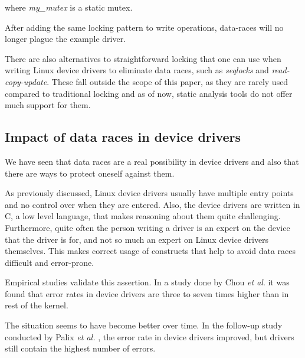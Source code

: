 \documentclass[..thesis.tex]{subfiles}
\begin{document}
where \textit{my\_mutex} is a static mutex.

After adding the same locking pattern to write operations, data-races will no longer plague the example driver.




There are also alternatives to straightforward locking that one can use when writing Linux device drivers to eliminate data races, such as \textit{seqlocks} and \textit{read-copy-update}. These fall outside the scope of this paper, as they are rarely used compared to traditional locking and as of now, static analysis tools do not offer much support for them. 


\subsection{Impact of data races in device drivers}

We have seen that data races are a real possibility in device drivers and also that there are ways to protect oneself against them. 


As previously discussed, Linux device drivers usually have multiple entry points and no control over when they are entered. Also, the device drivers are written in C, a low level language, that makes reasoning about them quite challenging. Furthermore, quite often the person writing a driver is an expert on the device that the driver is for, and not so much an expert on Linux device drivers themselves. This makes correct usage of constructs that help to avoid data races difficult and error-prone.




Empirical studies validate this assertion. In a study done by Chou \textit{et al}. \cite{chou_empirical_2001} it was found that error rates in device drivers are three to seven times higher than in rest of the kernel. 

The situation seems to have become better over time. In the follow-up study conducted by Palix \textit{et al.} \cite{palix_faults_2011}, the error rate in device drivers improved, but drivers still contain the highest number of errors.
\end{document}
